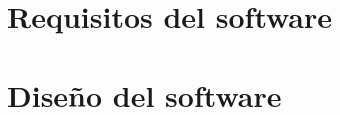     \localtableofcontents


    \section{Requisitos del software}\label{sec:requisitos-del-software}
    

    \section{Diseño del software}\label{sec:diseno-del-software}
    
